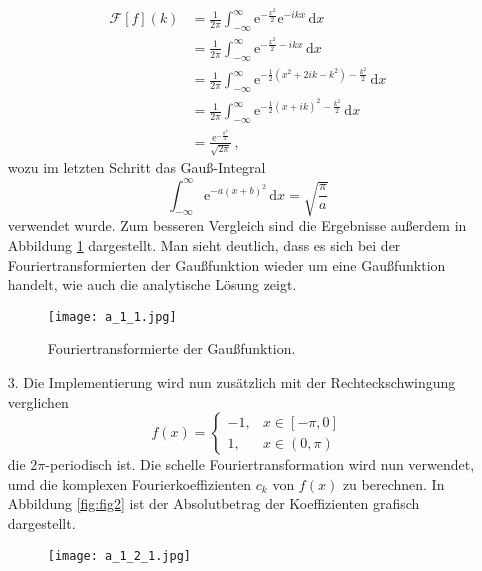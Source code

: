 \begin{itemize}[leftmargin=*]
\begin{align*}
						\mathcal{F}\left[f\right](k)
											&= \frac{1}{2 \pi} \int_{-\infty}^{\infty}  \text{e}^{-\frac{x^2}{2}} \text{e}^{-i k x} \, \text{d}x \\
											&= \frac{1}{2 \pi} \int_{-\infty}^{\infty}  \text{e}^{-\frac{x^2}{2}-i k x} \, \text{d}x \\
											&= \frac{1}{2 \pi} \int_{-\infty}^{\infty}  \text{e}^{-\frac{1}{2}\left(x^2+2ik-k^2\right) - \frac{k^2}{2}} \, \text{d}x \\
											&= \frac{1}{2 \pi} \int_{-\infty}^{\infty}  \text{e}^{-\frac{1}{2}\left(x+ik\right)^2-\frac{k^2}{2}} \, \text{d}x \\
											&= \frac{\text{e}^{-\frac{k^2}{2}}}{\sqrt{2 \pi}} \, ,
					\end{align*}
					wozu im letzten Schritt das Gauß-Integral
					\begin{equation*}
						\int_{-\infty}^{\infty}  \text{e}^{-a\left(x+b\right)^2}  \, \text{d}x = \sqrt{\frac{\pi}{a}}
					\end{equation*}
					verwendet wurde.
					Zum besseren Vergleich sind die Ergebnisse außerdem in Abbildung \ref{fig:fig1} dargestellt. Man sieht deutlich,
					dass es sich bei der Fouriertransformierten der Gaußfunktion wieder um eine Gaußfunktion handelt, wie auch die
					analytische Lösung zeigt.
					\FloatBarrier
					\begin{figure}[H]
					    \centering
					    \texttt{[image: a\_1\_1.jpg]}
					    \caption{Fouriertransformierte der Gaußfunktion.}
					    \label{fig:fig1}
					\end{figure}
					\FloatBarrier
					\noindent
\item[3.] Die Implementierung wird nun zusätzlich mit der Rechteckschwingung verglichen
					\begin{equation*}
						f\left(x\right) = \begin{cases}
																-1, & x \in \left[-\pi, 0\right] \\
																1,  & x \in \left(0, \pi\right) \,
															\end{cases}
					\end{equation*}
					die $2 \pi$-periodisch ist. Die schelle Fouriertransformation wird nun verwendet, umd die komplexen Fourierkoeffizienten $c_k$ von $f(x)$ zu berechnen. In Abbildung \ref{fig:fig2} ist der Absolutbetrag der
					Koeffizienten grafisch dargestellt.
					\FloatBarrier
					\begin{figure}[H]
							\centering
							\texttt{[image: a\_1\_2\_1.jpg]}

\end{figure}
\end{itemize}
